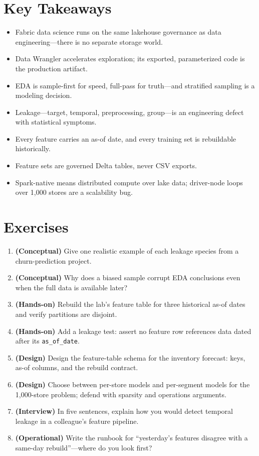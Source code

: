 \section*{Key Takeaways}
\begin{itemize}
    \item Fabric data science runs on the same lakehouse governance as data engineering---there is no separate storage world.
    \item Data Wrangler accelerates exploration; its exported, parameterized code is the production artifact.
    \item EDA is sample-first for speed, full-pass for truth---and stratified sampling is a modeling decision.
    \item Leakage---target, temporal, preprocessing, group---is an engineering defect with statistical symptoms.
    \item Every feature carries an as-of date, and every training set is rebuildable historically.
    \item Feature sets are governed Delta tables, never CSV exports.
    \item Spark-native means distributed compute over lake data; driver-node loops over 1,000 stores are a scalability bug.
\end{itemize}

\section{Exercises}
\begin{enumerate}
    \item \textbf{(Conceptual)} Give one realistic example of each leakage species from a churn-prediction project.
    \item \textbf{(Conceptual)} Why does a biased sample corrupt EDA conclusions even when the full data is available later?
    \item \textbf{(Hands-on)} Rebuild the lab's feature table for three historical as-of dates and verify partitions are disjoint.
    \item \textbf{(Hands-on)} Add a leakage test: assert no feature row references data dated after its \texttt{as\_of\_date}.
    \item \textbf{(Design)} Design the feature-table schema for the inventory forecast: keys, as-of columns, and the rebuild contract.
    \item \textbf{(Design)} Choose between per-store models and per-segment models for the 1,000-store problem; defend with sparsity and operations arguments.
    \item \textbf{(Interview)} In five sentences, explain how you would detect temporal leakage in a colleague's feature pipeline.
    \item \textbf{(Operational)} Write the runbook for ``yesterday's features disagree with a same-day rebuild''---where do you look first?
\end{enumerate}

